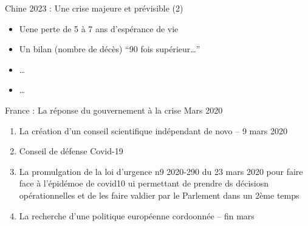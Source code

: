 \documentclass[
  ignorenonframetext,
]{beamer}
\providecommand{\tightlist}{%
  \setlength{\itemsep}{0pt}\setlength{\parskip}{0pt}}\usepackage{longtable,booktabs,array}
\begin{document}
\begin{frame}{Chine 2023 : Une crise majeure et prévisible (2)}
\protect\hypertarget{chine-2023-une-crise-majeure-et-pruxe9visible-2}{}
\begin{itemize}
\item
  Uene perte de 5 à 7 ans d'espérance de vie
\item
  Un bilan (nombre de décès) ``90 fois supérieur\ldots{}''
\item
  \ldots{}
\item
  \ldots{}
\end{itemize}
\end{frame}

\begin{frame}{France : La réponse du gouvernement à la crise Mars 2020}
\protect\hypertarget{france-la-ruxe9ponse-du-gouvernement-uxe0-la-crise-mars-2020}{}
\begin{enumerate}
\tightlist
\item
  La création d'un conseil scientifique indépendant de novo -- 9 mars
  2020
\item
  Conseil de défense Covid-19
\item
  La promulgation de la loi d'urgence n9 2020-290 du 23 mars 2020 pour
  faire face à l'épidémoe de covid10 ui permettant de prendre ds
  décisiosn opérationnelles et de les faire valdier par le Parlement
  dans un 2ème temps
\item
  La recherche d'une politique européenne cordoonnée -- fin mars
\end{enumerate}
\end{frame}
\end{document}
